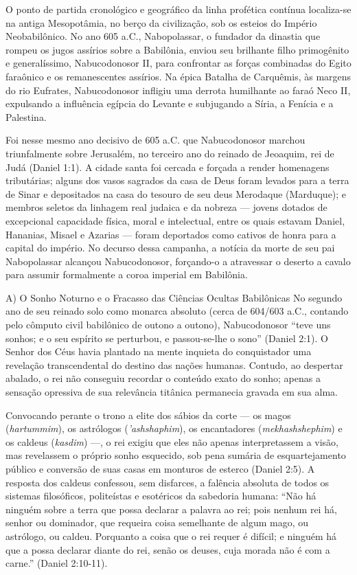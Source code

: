 \documentclass[11pt,a4paper,openany]{book}
\begin{document}
O ponto de partida cronológico e geográfico da linha profética contínua localiza-se na antiga Mesopotâmia, no berço da civilização, sob os esteios do Império Neobabilônico. No ano 605 a.C., Nabopolassar, o fundador da dinastia que rompeu os jugos assírios sobre a Babilônia, enviou seu brilhante filho primogênito e generalíssimo, Nabucodonosor II, para confrontar as forças combinadas do Egito faraônico e os remanescentes assírios. Na épica Batalha de Carquêmis, às margens do rio Eufrates, Nabucodonosor infligiu uma derrota humilhante ao faraó Neco II, expulsando a influência egípcia do Levante e subjugando a Síria, a Fenícia e a Palestina.

Foi nesse mesmo ano decisivo de 605 a.C. que Nabucodonosor marchou triunfalmente sobre Jerusalém, no terceiro ano do reinado de Jeoaquim, rei de Judá (Daniel 1:1). A cidade santa foi cercada e forçada a render homenagens tributárias; alguns dos vasos sagrados da casa de Deus foram levados para a terra de Sinar e depositados na casa do tesouro de seu deus Merodaque (Marduque); e membros seletos da linhagem real judaica e da nobreza — jovens dotados de excepcional capacidade física, moral e intelectual, entre os quais estavam Daniel, Hananias, Misael e Azarias — foram deportados como cativos de honra para a capital do império. No decurso dessa campanha, a notícia da morte de seu pai Nabopolassar alcançou Nabucodonosor, forçando-o a atravessar o deserto a cavalo para assumir formalmente a coroa imperial em Babilônia.

A) O Sonho Noturno e o Fracasso das Ciências Ocultas Babilônicas
No segundo ano de seu reinado solo como monarca absoluto (cerca de 604/603 a.C., contando pelo cômputo civil babilônico de outono a outono), Nabucodonosor ``teve uns sonhos; e o seu espírito se perturbou, e passou-se-lhe o sono'' (Daniel 2:1). O Senhor dos Céus havia plantado na mente inquieta do conquistador uma revelação transcendental do destino das nações humanas. Contudo, ao despertar abalado, o rei não conseguiu recordar o conteúdo exato do sonho; apenas a sensação opressiva de sua relevância titânica permanecia gravada em sua alma.

Convocando perante o trono a elite dos sábios da corte — os magos (\textit{hartummim}), os astrólogos (\textit{'ashshaphim}), os encantadores (\textit{mekhashshephim}) e os caldeus (\textit{kasdim}) —, o rei exigiu que eles não apenas interpretassem a visão, mas revelassem o próprio sonho esquecido, sob pena sumária de esquartejamento público e conversão de suas casas em monturos de esterco (Daniel 2:5). A resposta dos caldeus confessou, sem disfarces, a falência absoluta de todos os sistemas filosóficos, politeístas e esotéricos da sabedoria humana:
``Não há ninguém sobre a terra que possa declarar a palavra ao rei; pois nenhum rei há, senhor ou dominador, que requeira coisa semelhante de algum mago, ou astrólogo, ou caldeu. Porquanto a coisa que o rei requer é difícil; e ninguém há que a possa declarar diante do rei, senão os deuses, cuja morada não é com a carne.'' (Daniel 2:10-11).
\end{document}
